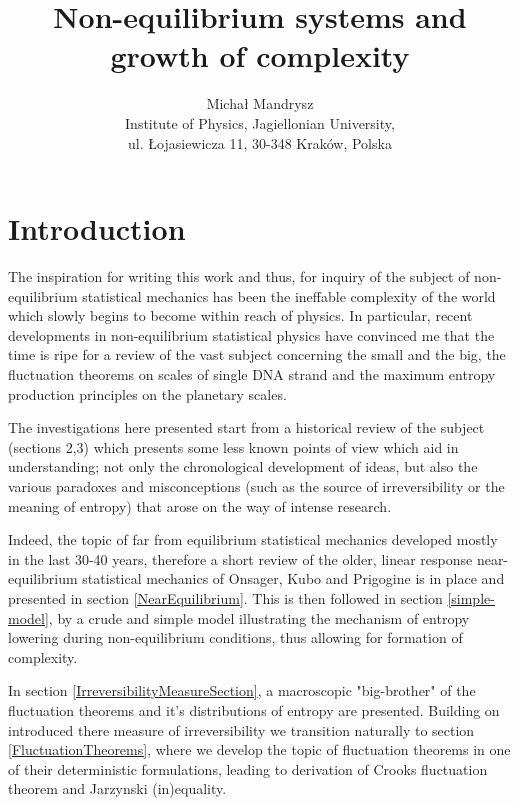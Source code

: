 \documentclass[a4paper,12pt]{article}
\begin{document}
\title{Non-equilibrium systems and growth of complexity}

\author{Michał Mandrysz \\
Institute of Physics, Jagiellonian University, \\ul. Łojasiewicza
11, 30-348 Kraków, Polska }

\maketitle

\tableofcontents

\newpage

\section{Introduction}

The inspiration for writing this work and thus, for inquiry of the subject of non-equilibrium statistical mechanics has been the ineffable complexity of the world which slowly begins to become within reach of physics. 
In particular, recent developments in non-equilibrium statistical physics have convinced me that the time is ripe for a review of the vast subject concerning the small and the big, the fluctuation theorems on scales of single DNA strand and the maximum entropy production principles on the planetary scales.

The investigations here presented start from a historical review of the subject (sections 2,3) which presents some less known points of view which aid in understanding; not only the chronological development of ideas, but also the various paradoxes and misconceptions (such as the source of irreversibility or the meaning of entropy) that arose on the way of intense research. 

Indeed, the topic of far from equilibrium statistical mechanics developed mostly in the last 30-40 years, therefore a short review of the older, linear response near-equilibrium statistical mechanics of Onsager, Kubo and Prigogine is in place and presented in section \ref{NearEquilibrium}. This is then followed in section \ref{simple-model}, by a crude and simple model illustrating the mechanism of entropy lowering during non-equilibrium conditions, thus allowing for formation of complexity.

In section \ref{IrreversibilityMeasureSection},  a macroscopic "big-brother" of the fluctuation theorems and it's distributions of entropy are presented. Building on introduced there measure of irreversibility we transition naturally to section \ref{FluctuationTheorems}, where we develop the topic of fluctuation theorems in one of their deterministic formulations, leading to derivation of Crooks fluctuation theorem and Jarzynski (in)equality.
\end{document}
